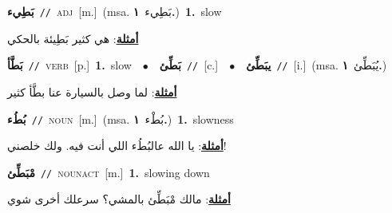 \documentclass[10pt,a4paper,twoside]{article} %
\begin{document}
\begin{multicols}{2}
{\setlength\topsep{0pt}\textbf{\foreignlanguage{arabic}{بَطِيء}}\ {\color{gray}\texttt{//}\color{black}}\ \textsc{adj}\ [m.]\ \color{gray}(msa. \foreignlanguage{arabic}{بَطِيء}~\foreignlanguage{arabic}{\textbf{١.}})\color{black}\ \textbf{1.}~slow\  \begin{flushright}\color{gray}\foreignlanguage{arabic}{\textbf{\underline{\foreignlanguage{arabic}{أمثلة}}}: هي كثير بَطِيئة بالحكي}\end{flushright}\color{black}} \vspace{2mm}

{\setlength\topsep{0pt}\textbf{\foreignlanguage{arabic}{بَطَّأ}}\ {\color{gray}\texttt{//}\color{black}}\ \textsc{verb}\ [p.]\ \textbf{1.}~slow\ \ $\bullet$\ \ \setlength\topsep{0pt}\textbf{\foreignlanguage{arabic}{بَطِّئ}}\ {\color{gray}\texttt{//}\color{black}}\ [c.]\ \ $\bullet$\ \ \setlength\topsep{0pt}\textbf{\foreignlanguage{arabic}{يبَطِّئ}}\ {\color{gray}\texttt{//}\color{black}}\ [i.]\ \color{gray}(msa. \foreignlanguage{arabic}{يُبَطِّئ}~\foreignlanguage{arabic}{\textbf{١.}})\color{black}\  \begin{flushright}\color{gray}\foreignlanguage{arabic}{\textbf{\underline{\foreignlanguage{arabic}{أمثلة}}}: لما وصل بالسيارة عنا بطَّأ كثير}\end{flushright}\color{black}} \vspace{2mm}

{\setlength\topsep{0pt}\textbf{\foreignlanguage{arabic}{بُطُء}}\ {\color{gray}\texttt{//}\color{black}}\ \textsc{noun}\ [m.]\ \color{gray}(msa. \foreignlanguage{arabic}{بُطْء}~\foreignlanguage{arabic}{\textbf{١.}})\color{black}\ \textbf{1.}~slowness\  \begin{flushright}\color{gray}\foreignlanguage{arabic}{\textbf{\underline{\foreignlanguage{arabic}{أمثلة}}}: يا الله عالبُطُء اللي أنت فيه. ولك خلصني!}\end{flushright}\color{black}} \vspace{2mm}

{\setlength\topsep{0pt}\textbf{\foreignlanguage{arabic}{مْبَطِّئ}}\ {\color{gray}\texttt{//}\color{black}}\ \textsc{noun\textunderscore act}\ [m.]\ \textbf{1.}~slowing down\  \begin{flushright}\color{gray}\foreignlanguage{arabic}{\textbf{\underline{\foreignlanguage{arabic}{أمثلة}}}: مالك مْبَطِّئ بالمشي؟ سرعلك أخرى شوي}\end{flushright}\color{black}} \vspace{2mm}


\end{multicols}
\end{document}
